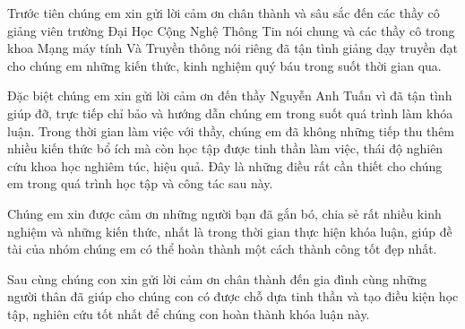 \begin{acknowledgements}      

	Trước tiên chúng em xin gửi lời cảm ơn chân thành và sâu sắc đến các thầy cô giảng viên trường Đại Học Cộng Nghệ Thông Tin nói chung và các thầy cô trong khoa Mạng máy tính Và Truyền thông nói riêng đã tận tình giảng dạy truyền đạt cho chúng em những kiến thức, kinh nghiệm quý báu trong suốt thời gian qua.

	Đặc biệt chúng em xin gửi lời cảm ơn đến thầy Nguyễn Anh Tuấn vì đã tận tình giúp đỡ, trực tiếp chỉ bảo và hướng dẫn chúng em trong suốt quá trình làm khóa luận. Trong thời gian làm việc với thầy, chúng em đã không những tiếp thu thêm nhiều kiến thức bổ ích mà còn học tập được tinh thần làm việc, thái độ nghiên cứu khoa học nghiêm túc, hiệu quả. Đây là những điều rất cần thiết cho chúng em trong quá trình học tập và công tác sau này.

	Chúng em xin được cảm ơn những người bạn đã gắn bó, chia sẻ rất nhiều kinh nghiệm và những kiến thức, nhất là trong thời gian thực hiện khóa luận, giúp đề tài của nhóm chúng em có thể hoàn thành một cách thành công tốt đẹp nhất.

	Sau cùng chúng con xin gửi lời cảm ơn chân thành đến gia đình cùng những người thân đã giúp cho chúng con có được chỗ dựa tinh thần và tạo điều kiện học tập, nghiên cứu tốt nhất để chúng con hoàn thành khóa luận này.

\end{acknowledgements}